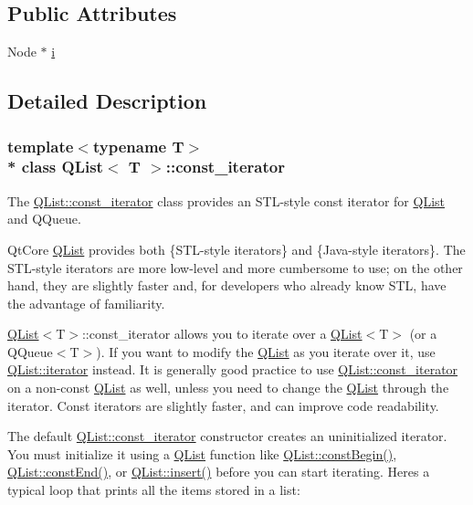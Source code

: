\subsection*{Public Attributes}
\begin{DoxyCompactItemize}
\item 
Node $\ast$ \hyperlink{class_q_list_1_1const__iterator_aaf98a66ebc335c3f611550ce99c1406c}{i}
\end{DoxyCompactItemize}


\subsection{Detailed Description}
\subsubsection*{template$<$typename T$>$\\*
class Q\+List$<$ T $>$\+::const\+\_\+iterator}

The \hyperlink{class_q_list_1_1const__iterator}{Q\+List\+::const\+\_\+iterator} class provides an S\+T\+L-\/style const iterator for \hyperlink{class_q_list}{Q\+List} and Q\+Queue. 

Qt\+Core \hyperlink{class_q_list}{Q\+List} provides both \{S\+T\+L-\/style iterators\} and \{Java-\/style iterators\}. The S\+T\+L-\/style iterators are more low-\/level and more cumbersome to use; on the other hand, they are slightly faster and, for developers who already know S\+TL, have the advantage of familiarity.

\hyperlink{class_q_list}{Q\+List}$<$T$>$\+::const\+\_\+iterator allows you to iterate over a \hyperlink{class_q_list}{Q\+List}$<$T$>$ (or a Q\+Queue$<$T$>$). If you want to modify the \hyperlink{class_q_list}{Q\+List} as you iterate over it, use \hyperlink{class_q_list_1_1iterator}{Q\+List\+::iterator} instead. It is generally good practice to use \hyperlink{class_q_list_1_1const__iterator}{Q\+List\+::const\+\_\+iterator} on a non-\/const \hyperlink{class_q_list}{Q\+List} as well, unless you need to change the \hyperlink{class_q_list}{Q\+List} through the iterator. Const iterators are slightly faster, and can improve code readability.

The default \hyperlink{class_q_list_1_1const__iterator}{Q\+List\+::const\+\_\+iterator} constructor creates an uninitialized iterator. You must initialize it using a \hyperlink{class_q_list}{Q\+List} function like \hyperlink{class_q_list_a8f6d53fe01e1c2aaea0a446580f99cdb}{Q\+List\+::const\+Begin()}, \hyperlink{class_q_list_a66e34d5df478dda9190b9b075317690d}{Q\+List\+::const\+End()}, or \hyperlink{class_q_list_a2ae4b66fdb5875c4c55eb903fa5ca25b}{Q\+List\+::insert()} before you can start iterating. Here\textquotesingle{}s a typical loop that prints all the items stored in a list\+:


